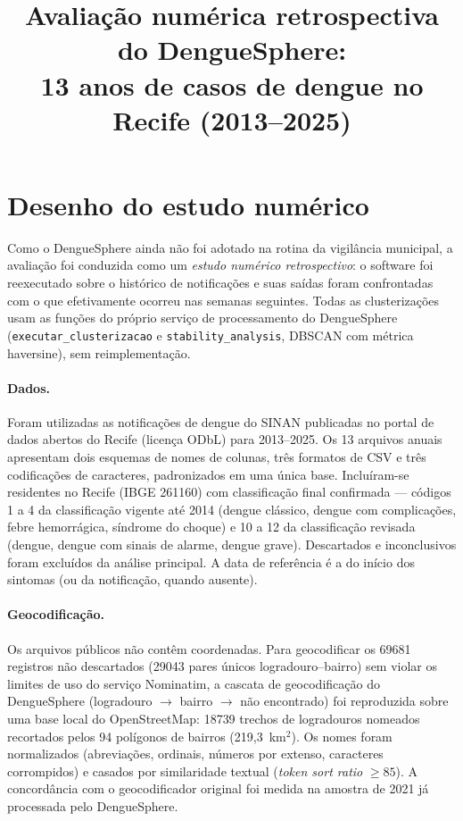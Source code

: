 \documentclass[11pt,a4paper]{article}
\title{Avaliação numérica retrospectiva do DengueSphere:\\ 13 anos de casos de dengue no Recife (2013--2025)}
\author{}
\date{}
\begin{document}
\maketitle

\section{Desenho do estudo numérico}
\label{sec:desenho}

Como o DengueSphere ainda não foi adotado na rotina da vigilância municipal, a avaliação foi conduzida como um
\emph{estudo numérico retrospectivo}: o software foi reexecutado sobre o histórico de notificações e suas saídas foram
confrontadas com o que efetivamente ocorreu nas semanas seguintes. Todas as clusterizações usam as funções do próprio
serviço de processamento do DengueSphere (\texttt{executar\_clusterizacao} e \texttt{stability\_analysis}, DBSCAN com
métrica haversine), sem reimplementação.

\paragraph{Dados.} Foram utilizadas as notificações de dengue do SINAN publicadas no portal de dados abertos do Recife
(licença ODbL) para 2013--2025. Os 13 arquivos anuais apresentam dois esquemas de nomes de colunas, três formatos de CSV
e três codificações de caracteres, padronizados em uma única base. Incluíram-se residentes no Recife (IBGE 261160) com
classificação final confirmada --- códigos 1 a 4 da classificação vigente até 2014 (dengue clássico, dengue com
complicações, febre hemorrágica, síndrome do choque) e 10 a 12 da classificação revisada (dengue, dengue com sinais de
alarme, dengue grave). Descartados e inconclusivos foram excluídos da análise principal. A data de referência é a do
início dos sintomas (ou da notificação, quando ausente).

\paragraph{Geocodificação.} Os arquivos públicos não contêm coordenadas. Para geocodificar os \num{69681} registros não
descartados (\num{29043} pares únicos logradouro--bairro) sem violar os limites de uso do serviço Nominatim, a cascata
de geocodificação do DengueSphere (logradouro $\rightarrow$ bairro $\rightarrow$ não encontrado) foi reproduzida sobre
uma base local do OpenStreetMap: \num{18739} trechos de logradouros nomeados recortados pelos 94 polígonos de bairros
(219,3~km$^2$). Os nomes foram normalizados (abreviações, ordinais, números por extenso, caracteres corrompidos) e casados
por similaridade textual (\emph{token sort ratio} $\geq 85$). A concordância com o geocodificador original foi medida na
amostra de 2021 já processada pelo DengueSphere.
\end{document}
